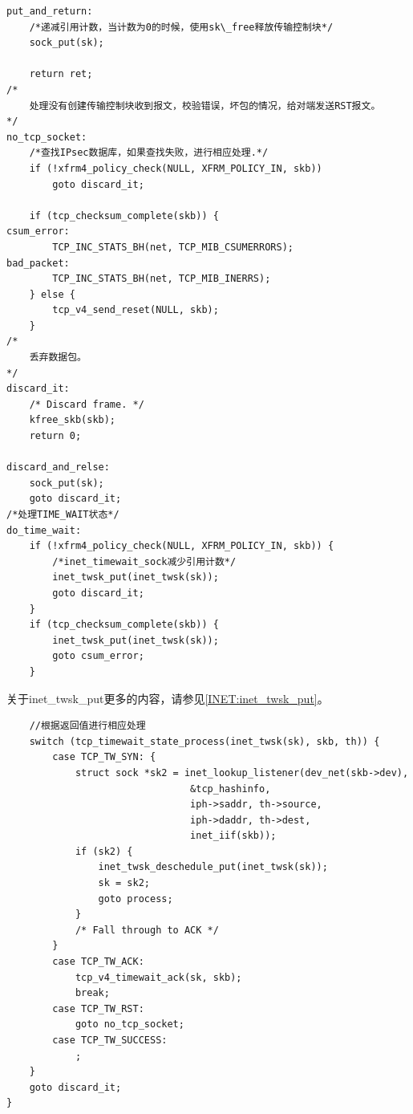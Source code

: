 \begin{verbatim}
put_and_return:
	/*递减引用计数，当计数为0的时候，使用sk\_free释放传输控制块*/
	sock_put(sk);

	return ret;
/*
	处理没有创建传输控制块收到报文，校验错误，坏包的情况，给对端发送RST报文。
*/
no_tcp_socket:
	/*查找IPsec数据库，如果查找失败，进行相应处理.*/
	if (!xfrm4_policy_check(NULL, XFRM_POLICY_IN, skb))
		goto discard_it;

	if (tcp_checksum_complete(skb)) {
csum_error:
		TCP_INC_STATS_BH(net, TCP_MIB_CSUMERRORS);
bad_packet:
		TCP_INC_STATS_BH(net, TCP_MIB_INERRS);
	} else {
		tcp_v4_send_reset(NULL, skb);
	}
/*
	丢弃数据包。	
*/
discard_it:
	/* Discard frame. */
	kfree_skb(skb);
	return 0;

discard_and_relse:
	sock_put(sk);
	goto discard_it;
/*处理TIME_WAIT状态*/
do_time_wait:
	if (!xfrm4_policy_check(NULL, XFRM_POLICY_IN, skb)) {
		/*inet_timewait_sock减少引用计数*/		
		inet_twsk_put(inet_twsk(sk));
		goto discard_it;
	}
	if (tcp_checksum_complete(skb)) {
		inet_twsk_put(inet_twsk(sk));
		goto csum_error;
	}
\end{verbatim}
	关于inet\_twsk\_put更多的内容，请参见\ref{INET:inet_twsk_put}。

\begin{verbatim}
	//根据返回值进行相应处理
	switch (tcp_timewait_state_process(inet_twsk(sk), skb, th)) {
		case TCP_TW_SYN: {
			struct sock *sk2 = inet_lookup_listener(dev_net(skb->dev),
								&tcp_hashinfo,
								iph->saddr, th->source,
								iph->daddr, th->dest,
								inet_iif(skb));
			if (sk2) {
				inet_twsk_deschedule_put(inet_twsk(sk));
				sk = sk2;
				goto process;
			}
			/* Fall through to ACK */
		}
		case TCP_TW_ACK:
			tcp_v4_timewait_ack(sk, skb);
			break;
		case TCP_TW_RST:
			goto no_tcp_socket;
		case TCP_TW_SUCCESS:
			;
	}
	goto discard_it;
}
\end{verbatim}


